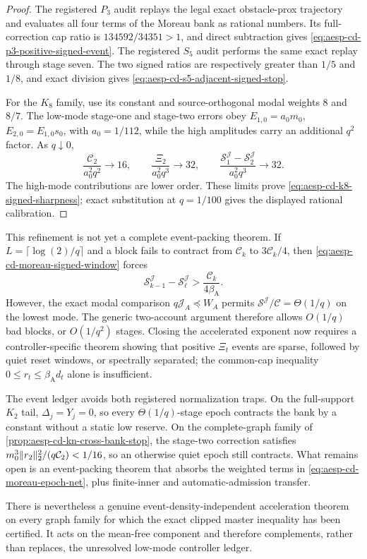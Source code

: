 \begin{proof}
The registered $P_3$ audit replays the legal exact obstacle-prox trajectory
and evaluates all four terms of the Moreau bank as rational numbers.  Its
full-correction cap ratio is $134592/34351>1$, and direct subtraction gives
\cref{eq:aesp-cd-p3-positive-signed-event}.
The registered $S_5$ audit performs the same exact replay through stage
seven.  The two signed ratios are respectively greater than $1/5$ and
$1/8$, and exact division gives
\cref{eq:aesp-cd-s5-adjacent-signed-stop}.

For the $K_8$ family, use its constant and source-orthogonal modal weights
$8$ and $8/7$.  The low-mode stage-one and stage-two errors obey
$E_{1,0}=a_0m_0$, $E_{2,0}=E_{1,0}s_0$, with $a_0=1/112$, while the high
amplitudes carry an additional $q^2$ factor.  As $q\downarrow0$,
\begin{equation*}
 \frac{\mathcal C_2}{a_0^2q^2}\longrightarrow16,
 \qquad
 \frac{\Xi_2}{a_0^2q^3}\longrightarrow32,
 \qquad
 \frac{\mathcal S_1^{\mathcal J}-\mathcal S_2^{\mathcal J}}
 {a_0^2q^3}\longrightarrow32.
\end{equation*}
The high-mode contributions are lower order.  These limits prove
\cref{eq:aesp-cd-k8-signed-sharpness}; exact substitution at $q=1/100$ gives
the displayed rational calibration.
\end{proof}

This refinement is not yet a complete event-packing theorem.  If
$L=\lceil\log(2)/q\rceil$ and a block fails to contract from
$\mathcal C_k$ to $3\mathcal C_k/4$, then
\cref{eq:aesp-cd-moreau-signed-window} forces
\begin{equation*}
 \mathcal S_{k-1}^{\mathcal J}-\mathcal S_\ell^{\mathcal J}
 >\frac{\mathcal C_k}{4\beta_{\mathrm A}}.
\end{equation*}
However, the exact modal comparison
$q\mathcal J_A\preceq W_A$ permits
$\mathcal S^{\mathcal J}/\mathcal C=\Theta(1/q)$ on the lowest mode.  The
generic two-account argument therefore allows $O(1/q)$ bad blocks, or
$O(1/q^2)$ stages.  Closing the accelerated exponent now requires a
controller-specific theorem showing that positive $\Xi_t$ events are sparse,
followed by quiet reset windows, or spectrally separated; the common-cap
inequality $0\leq r_t\leq\beta_{\mathrm A}d_t$ alone is insufficient.

The event ledger avoids both registered normalization traps.  On the
full-support $K_2$ tail, $\Delta_j=Y_j=0$, so every
$\Theta(1/q)$-stage epoch contracts the bank by a constant without a static
low reserve.  On the complete-graph family of
\cref{prop:aesp-cd-kn-cross-bank-stop}, the stage-two correction satisfies
$m_0^3\lVert r_2\rVert_2^2/(q\mathcal C_2)<1/16$, so an otherwise quiet epoch still
contracts.  What remains open is an event-packing theorem that absorbs the
weighted terms in \eqref{eq:aesp-cd-moreau-epoch-net}, plus finite-inner and
automatic-admission transfer.

There is nevertheless a genuine event-density-independent acceleration
theorem on every graph family for which the exact clipped master inequality
has been certified.  It acts on the mean-free component and therefore
complements, rather than replaces, the unresolved low-mode controller ledger.

